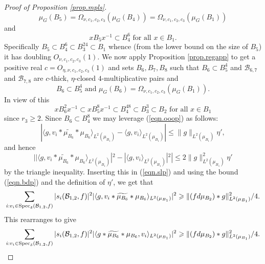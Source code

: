 \documentclass[12pt]{amsart}
\numberwithin{equation}{section}
\theoremstyle{plain}
\theoremstyle{definition}
\renewcommand{\leq}{\leqslant}
\renewcommand{\geq}{\geqslant}
\providecommand{\Spec}{\mathop{\rm Spec}\nolimits}
\begin{document}
\begin{proof}[Proof of Proposition \ref{prop.mpls}]
\begin{equation*}
\mu_G(B_5) = \Omega_{\nu,c_1,c_2,c_3}(\mu_G(B_4)) =\Omega_{\nu,c_1,c_2,c_3}(\mu_G(B_1))
\end{equation*}
and
\begin{equation*}
xB_5x^{-1} \subset B_4^6 \textrm{ for all } x \in B_1.
\end{equation*}
Specifically $B_5 \subset B_4^6 \subset B_3^{24} \subset B_1$ whence (from the lower bound on the size of $B_5$) it has doubling $O_{\nu,c_1,c_2,c_3}(1)$.  We now apply Proposition \ref{prop.regapp} to get a positive real $c=O_{\eta,\nu,c_1,c_2,c_3}(1)$ and sets $B_6,B_7,B_8$ such that $B_6 \subset B_5^4$ and $\mathcal{B}_{6,7}$ and $\mathcal{B}_{7,8}$ are $c$-thick, $\eta$-closed $4$-multiplicative pairs and
\begin{equation*}
B_6 \subset B_5^4 \textrm{ and } \mu_G(B_6) = \Omega_{\nu,c_1,c_2,c_3}(\mu_G(B_1)).
\end{equation*}
In view of this
\begin{equation*}
xB_6^2x^{-1} \subset xB_5^8x^{-1} \subset B_4^{48} \subset B_3^{3}\subset B_2 \textrm{ for all } x\in B_1
\end{equation*}
since $r_3\geq 2$.  Since $B_6 \subset B_4^{8}$ we may leverage (\ref{eqn.ooop}) as follows:
\begin{equation*}
|\langle g,v_i \ast \widetilde{\mu_{B_6}} \ast \mu_{B_6}\rangle_{L^2(\mu_{B_1})}-\langle g,v_i\rangle_{L^2(\mu_{B_1})}|\leq \|g\|_{L^2(\mu_{B_1})}\eta',\end{equation*}
and hence
\begin{equation*}
||\langle g,v_i \ast \widetilde{\mu_{B_6}} \ast \mu_{B_6}\rangle_{L^2(\mu_{B_1})}|^2-|\langle g,v_i\rangle_{L^2(\mu_{B_1})}|^2|\leq 2\|g\|_{L^2(\mu_{B_1})}^2\eta'
\end{equation*}
by the triangle inequality.  Inserting this in (\ref{eqn.slp}) and using the bound (\ref{eqn.bdp}) and the definition of $\eta'$, we get that
\begin{equation*}
\sum_{i: v_i \in \Spec_\delta(\mathcal{B}_{1,2},f)}{|s_i(\mathcal{B}_{1,2},f)|^2|\langle g,v_i\ast\widetilde{\mu_{B_6}} \ast \mu_{B_6}\rangle_{L^2(\mu_{B_1})}|^2} \geq \|(fd\mu_{B_2}) \ast g \|_{L^2(\mu_{B_1})}^2/4.
\end{equation*}
This rearranges to give
\begin{equation*}
\sum_{i: v_i \in \Spec_\delta(\mathcal{B}_{1,2},f)}{|s_i(\mathcal{B}_{1,2},f)|^2|\langle g\ast \widetilde{\mu_{B_6}} \ast \mu_{B_6},v_i\rangle_{L^2(\mu_{B_1})}|^2} \geq \|(fd\mu_{B_2}) \ast g \|_{L^2(\mu_{B_1})}^2/4.

\end{equation*}
\end{proof}
\end{document}
